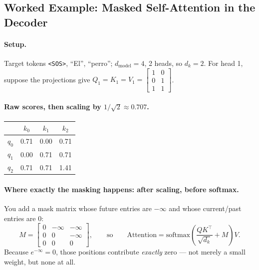 \documentclass[11pt,a4paper]{article}
\begin{document}
\subsection{Worked Example: Masked Self-Attention in the Decoder}

\paragraph{Setup.} Target tokens \texttt{<SOS>}, ``El'', ``perro'';
$d_{\text{model}} = 4$, 2 heads, so $d_k = 2$. For head 1, suppose the projections give
$Q_1 = K_1 = V_1 = \begin{bmatrix}1&0\\0&1\\1&1\end{bmatrix}$.

\paragraph{Raw scores, then scaling by $1/\sqrt{2} \approx 0.707$.}
\begin{center}
\begin{tabular}{c|ccc}
 & $k_0$ & $k_1$ & $k_2$ \\
\hline
$q_0$ & 0.71 & 0.00 & 0.71 \\
$q_1$ & 0.00 & 0.71 & 0.71 \\
$q_2$ & 0.71 & 0.71 & 1.41 \\
\end{tabular}
\end{center}

\paragraph{Where exactly the masking happens: after scaling, before softmax.} You add a mask
matrix whose future entries are $-\infty$ and whose current/past entries are 0:
\[
M = \begin{bmatrix}0 & -\infty & -\infty\\ 0 & 0 & -\infty\\ 0 & 0 & 0\end{bmatrix},
\qquad\text{so}\qquad
\mathrm{Attention} = \mathrm{softmax}\!\left(\frac{QK^\top}{\sqrt{d_k}} + M\right)V .
\]
Because $e^{-\infty} = 0$, those positions contribute \emph{exactly} zero --- not merely a
small weight, but none at all.
\end{document}
